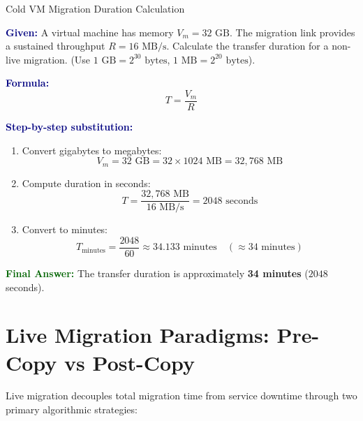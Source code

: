 \documentclass[11pt,a4paper,openany]{report}
\newcommand{\Given}{\par\textbf{\textcolor{navy}{Given:}} }
\newcommand{\Formula}{\par\textbf{\textcolor{navy}{Formula:}} }
\newcommand{\Steps}{\par\textbf{\textcolor{navy}{Step-by-step substitution:}}\par}
\newcommand{\Answer}{\par\textbf{\textcolor{darkgreen}{Final Answer:}} }
\begin{document}
\begin{solved}{Cold VM Migration Duration Calculation}
\Given A virtual machine has memory $V_m = 32\text{ GB}$. The migration link provides a sustained throughput $R = 16\text{ MB/s}$. Calculate the transfer duration for a non-live migration. (Use $1\text{ GB} = 2^{30}\text{ bytes}$, $1\text{ MB} = 2^{20}\text{ bytes}$).
\Formula
\begin{equation}
T = \frac{V_m}{R}
\end{equation}
\Steps
\begin{enumerate}[leftmargin=*]
  \item Convert gigabytes to megabytes:
  \begin{equation}
  V_m = 32\text{ GB} = 32 \times 1024\text{ MB} = 32,768\text{ MB}
  \end{equation}
  \item Compute duration in seconds:
  \begin{equation}
  T = \frac{32,768\text{ MB}}{16\text{ MB/s}} = 2048\text{ seconds}
  \end{equation}
  \item Convert to minutes:
  \begin{equation}
  T_{\text{minutes}} = \frac{2048}{60} \approx 34.133\text{ minutes} \quad (\approx 34\text{ minutes})
  \end{equation}
\end{enumerate}
\Answer The transfer duration is approximately \textbf{34 minutes} ($2048$ seconds).
\end{solved}

\section{Live Migration Paradigms: Pre-Copy vs Post-Copy}
Live migration decouples total migration time from service downtime through two primary algorithmic strategies:
\end{document}

